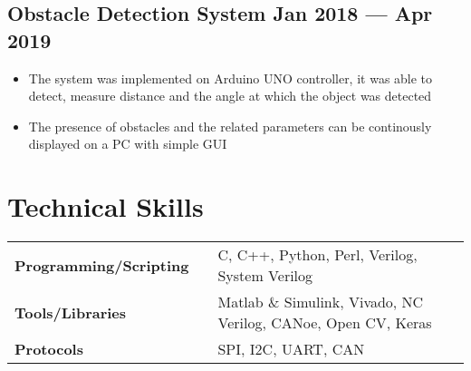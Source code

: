 \documentclass[a4,10pt]{article}
\newenvironment{zitemize}{
\begin{itemize}\itemsep0pt \parskip0pt \parsep1pt}
{\end{itemize}\vspace{-0.5cm}}
\newcommand{\hskills}[1]{
\textbf{\bfseries #1} }
\begin{document}
\subsection*{Obstacle Detection System \hfill Jan 2018 --- Apr 2019} 
    \begin{zitemize}
        \item The system was implemented on Arduino UNO controller, it was able to detect, measure distance and the angle at which the object was detected
        \item The presence of obstacles and the related parameters can be continously displayed on a PC with simple GUI
    \end{zitemize}









\section{Technical Skills}
\begin{tabular}{p{11em} p{1em} p{43em}}
\hskills{Programming/Scripting }&  &  C, C++, Python, Perl, Verilog, System Verilog \\
\hskills{Tools/Libraries} &  & Matlab \& Simulink, Vivado, NC Verilog, CANoe, Open CV, Keras \\
\hskills{Protocols} &  & SPI, I2C, UART, CAN \\
\end{tabular}
\vspace{-0.2cm}




\end{document}

